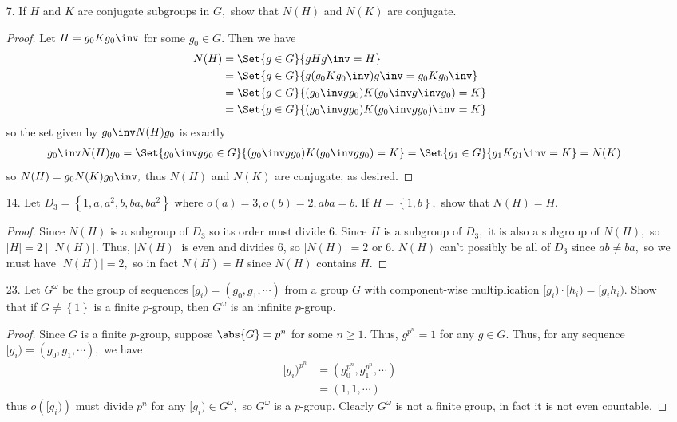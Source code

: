 \documentclass{article}
\begin{document}
\begin{itemize}
	\item[7.] If $H$ and $K$ are conjugate subgroups in $G,$ show that $N(H)$ and $N(K)$ are conjugate.
		\begin{proof}
			Let $H=g_0 K g_0\inv$ for some $g_0\in G.$ Then we have
			\begin{align*}
				N(H) &= \Set{g\in G}{gHg\inv=H} \\
				&= \Set{g\in G}{g(g_0 Kg_0\inv)g\inv = g_0 Kg_0\inv} \\
				&= \Set{g\in G}{(g_0\inv gg_0) K (g_0\inv g\inv g_0) = K} \\
				&= \Set{g\in G}{(g_0\inv gg_0) K (g_0\inv gg_0)\inv = K}
			\end{align*} so the set given by $g_0\inv N(H) g_0$ is exactly
			\begin{align*}
				g_0\inv N(H) g_0 &= \Set{g_0\inv gg_0 \in G}{(g_0\inv gg_0) K(g_0\inv gg_0)=K} = \Set{g_1\in G}{g_1 K g_1\inv = K} = N(K)
			\end{align*} so $N(H)=g_0 N(K) g_0\inv,$ thus $N(H)$ and $N(K)$ are conjugate, as desired.
			
		\end{proof}

	\item[14.] Let $D_3=\left\{ 1, a, a^2, b, ba, ba^2 \right\}$ where $o(a)=3, o(b)=2, aba=b.$ If $H=\left\{ 1, b \right\},$ show that $N(H)=H.$
		\begin{proof}
			Since $N(H)$ is a subgroup of $D_3$ so its order must divide 6. Since $H$ is a subgroup of $D_3,$ it is also a subgroup of $N(H),$ so $|H|=2\mid |N(H)|.$ Thus, $|N(H)|$ is even and divides 6, so $|N(H)|=2$ or 6. $N(H)$ can't possibly be all of $D_3$ since $ab\neq ba,$ so we must have $|N(H)|=2,$ so in fact $N(H)=H$ since $N(H)$ contains $H.$
			
		\end{proof}

	\item[23.] Let $G^{\omega}$ be the group of sequences $[g_i)=(g_0, g_1, \cdots)$ from a group $G$ with component-wise multiplication $[g_i)\cdot [h_i)=[g_ih_i).$ Show that if $G\neq \left\{ 1 \right\}$ is a finite $p$-group, then $G^{\omega}$ is an infinite $p$-group.
			\begin{proof}
				Since $G$ is a finite $p$-group, suppose $\abs{G}=p^n$ for some $n\ge 1.$ Thus, $g^{p^n}=1$ for any $g\in G.$ Thus, for any sequence $[g_i)=(g_0, g_1, \cdots),$ we have
					\begin{align*}
						[g_i)^{p^n} &= (g_0^{p^n}, g_1^{p^n}, \cdots) \\
							&=  (1, 1, \cdots)
						\end{align*} thus $o\left([g_i)\right)$ must divide $p^n$ for any $[g_i)\in G^{\omega},$ so $G^{\omega}$ is a $p$-group. Clearly $G^{\omega}$ is not a finite group, in fact it is not even countable.
							

\end{proof}
\end{itemize}
\end{document}
